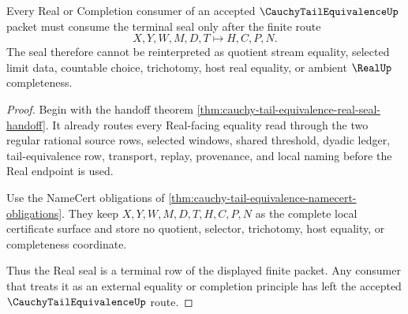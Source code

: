 \begin{theorem}
\label{thm:cauchy-tail-equivalence-real-seal-nonescape}
Every Real or Completion consumer of an accepted $\CauchyTailEquivalenceUp$ packet must consume the terminal seal only after the finite route
$$
X,Y,W,M,D,T \longmapsto H,C,P,N .
$$
The seal therefore cannot be reinterpreted as quotient stream equality, selected limit data, countable choice, trichotomy, host real equality, or ambient $\RealUp$ completeness.
\end{theorem}
\begin{proof}
Begin with the handoff theorem \autoref{thm:cauchy-tail-equivalence-real-seal-handoff}. It already routes every Real-facing equality read through the two regular rational source rows, selected windows, shared threshold, dyadic ledger, tail-equivalence row, transport, replay, provenance, and local naming before the Real endpoint is used.

Use the NameCert obligations of \autoref{thm:cauchy-tail-equivalence-namecert-obligations}. They keep $X,Y,W,M,D,T,H,C,P,N$ as the complete local certificate surface and store no quotient, selector, trichotomy, host equality, or completeness coordinate.

Thus the Real seal is a terminal row of the displayed finite packet. Any consumer that treats it as an external equality or completion principle has left the accepted $\CauchyTailEquivalenceUp$ route.
\end{proof}




